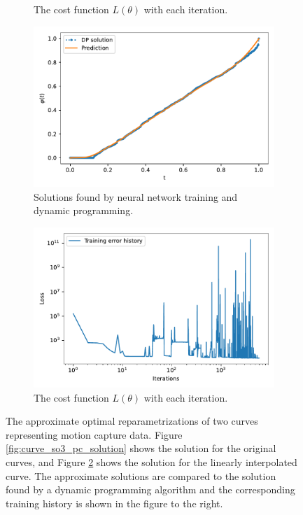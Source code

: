 \begin{figure}[t]
\begin{subfigure}[t]{0.5\textwidth}
        \caption{The cost function \(L(\theta)\) with each iteration.}\label{fig:curve_so3_pc_history}
    \end{subfigure}
    \begin{subfigure}[t]{0.5\textwidth}
        \centering
        \includegraphics[width=\linewidth]{figures/curve_so3/pl_eks_7/plot_155_0.pdf}
        \caption{Solutions found by neural network training and dynamic programming.}\label{fig:curve_so3_pl_solution}
    \end{subfigure}
    \begin{subfigure}[t]{0.5\textwidth}
        \centering
        \includegraphics[width=\linewidth]{figures/curve_so3/pl_eks_7/history_plot_155.pdf}
        \caption{The cost function \(L(\theta)\) with each iteration.}\label{fig:curve_so3_pl_history}
    \end{subfigure}
    \caption{The approximate optimal reparametrizations of two curves representing motion capture data. Figure \ref{fig:curve_so3_pc_solution} shows the solution for the original curves, and Figure \ref{fig:curve_so3_pl_solution} shows the solution for the linearly interpolated curve. The approximate solutions are compared to the solution found by a dynamic programming algorithm and the corresponding training history is shown in the figure to the right. }\label{fig:curve_1_so3_example}
\end{figure}

